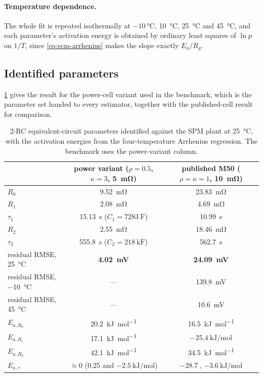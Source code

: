 \paragraph{Temperature dependence.} The whole fit is repeated isothermally at
$\SI{-10}{\celsius}$, \SI{10}{\celsius}, \SI{25}{\celsius} and \SI{45}{\celsius}, and each
parameter's activation energy is obtained by ordinary least squares of $\ln p$ on $1/T$, since
\eqref{eq:ecm-arrhenius} makes the slope exactly $E_a/R_g$.

\subsection{Identified parameters}
\cref{tab:spm-ident} gives the result for the power-cell variant used in the benchmark, which is
the parameter set  handed to every estimator, together
with the published-cell result for comparison.

\begin{table}[H]\centering
\caption{2-RC equivalent-circuit parameters identified against the SPM plant at
\SI{25}{\celsius}, with the activation energies from the four-temperature Arrhenius regression.
The benchmark uses the power-variant column.}
\label{tab:spm-ident}
\begin{tabular}{lcc}\toprule
 & power variant ($\rho{=}0.5$, $\kappa{=}3$, \SI{5}{\milli\ohm}) & published M50 ($\rho{=}\kappa{=}1$, \SI{10}{\milli\ohm}) \\ \midrule
$R_0$    & \SI{9.52}{\milli\ohm}  & \SI{23.83}{\milli\ohm} \\
$R_1$    & \SI{2.08}{\milli\ohm}  & \SI{4.69}{\milli\ohm} \\
$\tau_1$ & \SI{15.13}{\second} ($C_1 = \SI{7283}{\farad}$) & \SI{10.99}{\second} \\
$R_2$    & \SI{2.55}{\milli\ohm}  & \SI{18.46}{\milli\ohm} \\
$\tau_2$ & \SI{555.8}{\second} ($C_2 = \SI{218}{\kilo\farad}$) & \SI{562.7}{\second} \\[1mm]
residual RMSE, \SI{25}{\celsius} & \textbf{\SI{4.02}{\milli\volt}} & \textbf{\SI{24.09}{\milli\volt}} \\
residual RMSE, \SI{-10}{\celsius} & --- & \SI{139.8}{\milli\volt} \\
residual RMSE, \SI{45}{\celsius} & --- & \SI{10.6}{\milli\volt} \\[1mm]
$E_{a,R_0}$   & \SI{20.2}{\kilo\joule\per\mole} & \SI{16.5}{\kilo\joule\per\mole} \\
$E_{a,R_1}$   & \SI{17.1}{\kilo\joule\per\mole} & $-\SI{25.4}{\kilo\joule\per\mole}$ \\
$E_{a,R_2}$   & \SI{42.1}{\kilo\joule\per\mole} & \SI{34.5}{\kilo\joule\per\mole} \\
$E_{a,\tau}$  & $\approx 0$ (\SI{0.25}{} and $-\SI{2.5}{\kilo\joule\per\mole}$) & $-\SI{28.7}{}$, $-\SI{3.6}{\kilo\joule\per\mole}$ \\
\bottomrule\end{tabular}
\end{table}

